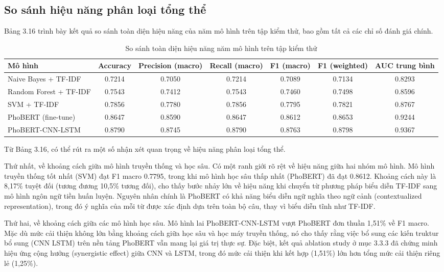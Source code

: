 \documentclass[14pt, a4paper]{report}
\begin{document}
\subsection{So sánh hiệu năng phân loại tổng thể}


Bảng 3.16 trình bày kết quả so sánh toàn diện hiệu năng của năm mô hình trên tập kiểm thử, bao gồm tất cả các chỉ số đánh giá chính.


\begin{table}[h]
\centering
\scriptsize
\caption{So sánh toàn diện hiệu năng năm mô hình trên tập kiểm thử}
\begin{tabular}{|p{2.4cm}|c|c|c|c|c|c|}
\hline
\textbf{Mô hình} & \textbf{Accuracy} & \textbf{Precision (macro)} & \textbf{Recall (macro)} & \textbf{F1 (macro)} & \textbf{F1 (weighted)} & \textbf{AUC trung bình} \\
\hline
Naive Bayes + TF-IDF & 0.7214 & 0.7050 & 0.7214 & 0.7089 & 0.7134 & 0.8293 \\
\hline
Random Forest + TF-IDF & 0.7543 & 0.7412 & 0.7543 & 0.7460 & 0.7498 & 0.8596 \\
\hline
SVM + TF-IDF & 0.7856 & 0.7780 & 0.7856 & 0.7795 & 0.7821 & 0.8767 \\
\hline
PhoBERT (fine-tune) & 0.8647 & 0.8590 & 0.8647 & 0.8612 & 0.8653 & 0.9244 \\
\hline
PhoBERT-CNN-LSTM & 0.8790 & 0.8745 & 0.8790 & 0.8763 & 0.8798 & 0.9367 \\
\hline
\end{tabular}
\normalsize
\end{table}




Từ Bảng 3.16, có thể rút ra một số nhận xét quan trọng về hiệu năng phân loại tổng thể.


Thứ nhất, về khoảng cách giữa mô hình truyền thống và học sâu. Có một ranh giới rõ rệt về hiệu năng giữa hai nhóm mô hình. Mô hình truyền thống tốt nhất (SVM) đạt F1 macro 0.7795, trong khi mô hình học sâu thấp nhất (PhoBERT) đã đạt 0.8612. Khoảng cách này là 8,17\% tuyệt đối (tương đương 10,5\% tương đối), cho thấy bước nhảy lớn về hiệu năng khi chuyển từ phương pháp biểu diễn TF-IDF sang mô hình ngôn ngữ tiền huấn luyện. Nguyên nhân chính là PhoBERT có khả năng biểu diễn ngữ nghĩa theo ngữ cảnh (contextualized representation), trong đó ý nghĩa của mỗi từ được xác định dựa trên toàn bộ câu, thay vì biểu diễn tĩnh như TF-IDF.


Thứ hai, về khoảng cách giữa các mô hình học sâu. Mô hình lai PhoBERT-CNN-LSTM vượt PhoBERT đơn thuần 1,51\% về F1 macro. Mặc dù mức cải thiện không lớn bằng khoảng cách giữa học sâu và học máy truyền thống, nó cho thấy rằng việc bổ sung các kiến truktur bổ sung (CNN \+ LSTM) trên nền tảng PhoBERT vẫn mang lại giá trị thực sự. Đặc biệt, kết quả ablation study ở mục 3.3.3 đã chứng minh hiệu ứng cộng hưởng (synergistic effect) giữa CNN và LSTM, trong đó mức cải thiện khi kết hợp (1,51\%) lớn hơn tổng mức cải thiện riêng lẻ (1,25\%).
\end{document}
